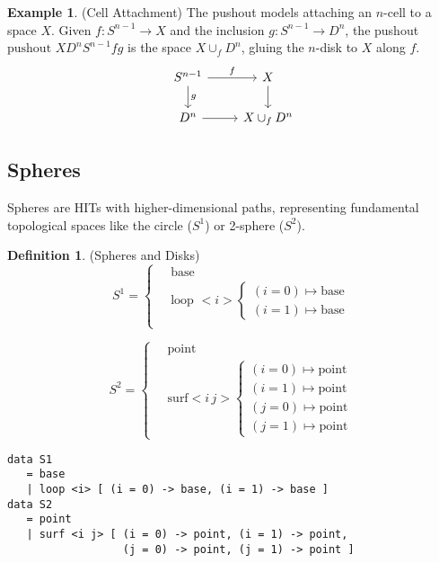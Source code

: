 \documentclass{article}
\theoremstyle{definition}
\newtheorem{definition}{Definition}
\newtheorem{example}{Example}
\begin{document}
\begin{example} (Cell Attachment)
The pushout models attaching an $n$-cell to a space $X$. Given $f : S^{n-1} \to X$ and the inclusion $g : S^{n-1} \to D^n$, the pushout $\text{pushout } X D^n S^{n-1} f g$ is the space $X \cup_f D^n$, gluing the $n$-disk to $X$ along $f$.
\[
\begin{tikzcd}
S^{n-1} \arrow[r, "f"] \arrow[d, "g"] & X \arrow[d] \\
D^n \arrow[r] & X \cup_f D^n
\end{tikzcd}
\]
\end{example}

\newpage
\subsection{Spheres}
Spheres are HITs with higher-dimensional paths, representing fundamental topological spaces like the circle ($S^1$) or 2-sphere ($S^2$).

\begin{definition} (Spheres and Disks)
\[
S^1 = \begin{cases}
\quad \text{base} \\
\quad \text{loop } <i> \begin{cases} (i = 0) \mapsto \text{base} \\ (i = 1) \mapsto \text{base} \end{cases} \\
\end{cases}
\]

\[
S^2 = \begin{cases}
\quad \text{point} \\
\quad \text{surf} <i \, j> \begin{cases}
(i = 0) \mapsto \text{point} \\
(i = 1) \mapsto \text{point} \\
(j = 0) \mapsto \text{point} \\
(j = 1) \mapsto \text{point}
\end{cases}
\end{cases}
\]
\begin{lstlisting}
data S1
   = base
   | loop <i> [ (i = 0) -> base, (i = 1) -> base ]
data S2
   = point
   | surf <i j> [ (i = 0) -> point, (i = 1) -> point,
                  (j = 0) -> point, (j = 1) -> point ]
\end{lstlisting}
\end{definition}
\end{document}
